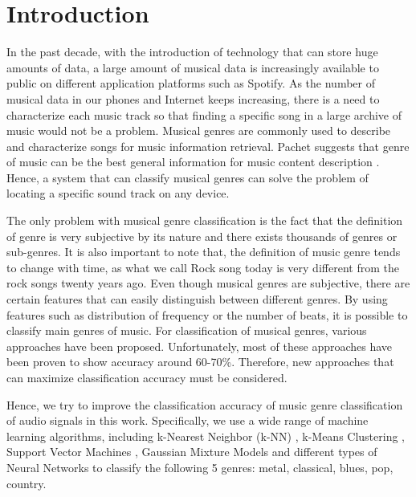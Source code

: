 \section{Introduction}
In the past decade, with the introduction of technology that can store huge amounts of data, a large amount of musical data is increasingly available to public on different application platforms such as Spotify. As the number of musical data in our phones and Internet keeps increasing, there is a need to characterize each music track so that finding a specific song in a large archive of music would not be a problem. Musical genres are commonly used to describe and characterize songs for music information retrieval. Pachet suggests that genre of music can be the best general information for music content description \cite{Pachet:2003}. Hence, a system that can classify musical genres can solve the problem of locating a specific sound track on any device. 

The only problem with musical genre classification is the fact that the definition of genre is very subjective by its nature and there exists thousands of genres or sub-genres. It is also important to note that, the definition of music genre tends to change with time, as what we call Rock song today is very different from the rock songs twenty years ago. Even though musical genres are subjective, there are certain features that can easily distinguish between different genres. By using features such as distribution of frequency or the number of beats, it is possible to classify main genres of music. For classification of musical genres, various approaches have been proposed. Unfortunately, most of these approaches have been proven to show accuracy around 60-70\%. Therefore, new approaches that can maximize classification accuracy must be considered.  

Hence, we try to improve the classification accuracy of music genre classification of audio signals in this work. Specifically, we use a wide range of machine learning algorithms, including k-Nearest Neighbor (k-NN) \cite{KNN:2009}, k-Means Clustering \cite{Clustering:2001}, Support Vector Machines \cite{SVM:2006}, Gaussian Mixture Models \cite{Pachet:2003} and different types of Neural Networks to classify the following 5 genres: metal, classical, blues, pop, country. 

